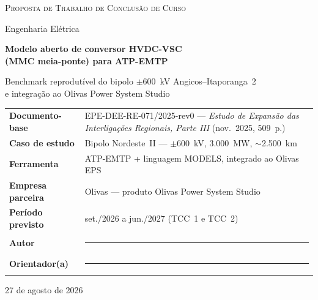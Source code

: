 \documentclass[12pt,a4paper]{article}
\renewcommand{\arraystretch}{1.22}
\begin{document}

\begin{titlepage}
\centering
\vspace*{1.5cm}

{\footnotesize\textsc{Proposta de Trabalho de Conclusão de Curso}\par}
\vspace{0.4cm}
{\footnotesize Engenharia Elétrica\par}

\vspace{2.5cm}

{\LARGE\bfseries Modelo aberto de conversor HVDC-VSC\\[0.25cm]
(MMC meia-ponte) para ATP-EMTP\par}

\vspace{0.9cm}

{\large Benchmark reprodutível do bipolo $\pm$600~kV Angicos--Itaporanga~2\\
e integração ao Olivas Power System Studio\par}

\vspace{2.5cm}

\begin{minipage}{0.92\textwidth}
\small
\renewcommand{\arraystretch}{1.35}
\begin{tabularx}{\textwidth}{@{}>{\bfseries}p{4.2cm}X@{}}
\toprule
Documento-base   & EPE-DEE-RE-071/2025-rev0 --- \textit{Estudo de Expansão das Interligações Regionais, Parte III} (nov.~2025, 509~p.) \\
Caso de estudo   & Bipolo Nordeste~II --- $\pm$600~kV, 3.000~MW, $\sim$2.500~km \\
Ferramenta       & ATP-EMTP + linguagem MODELS, integrado ao Olivas EPS \\
Empresa parceira & Olivas --- produto Olivas Power System Studio \\
Período previsto & set./2026 a jun./2027 (TCC~1 e TCC~2) \\
Autor            & \rule{5cm}{0.4pt} \\
Orientador(a)    & \rule{5cm}{0.4pt} \\
\bottomrule
\end{tabularx}
\end{minipage}

\vfill
{\footnotesize 27 de agosto de 2026\par}
\end{titlepage}
\end{document}
